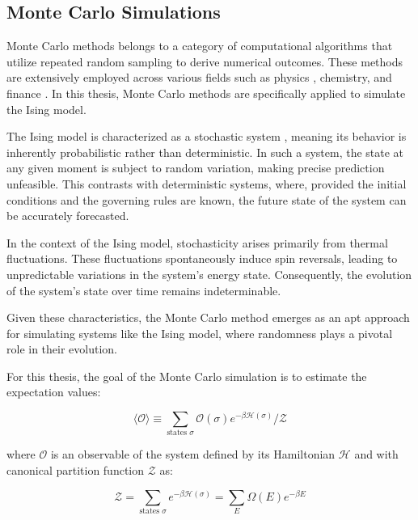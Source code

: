 \subsection{Monte Carlo Simulations}
\label{sec:montecarlo}

Monte Carlo methods \cite{Landau2021} belongs to a category of computational
algorithms that utilize repeated random sampling to derive numerical outcomes.
These methods are extensively employed across various fields such as physics
\cite{Landau2021}, chemistry, \cite{Andersen2019} and finance
\cite{Glasserman2008}. In this thesis, Monte Carlo methods are specifically
applied to simulate the Ising model.

The Ising model is characterized as a stochastic system \cite{Cinlar1975},
meaning its behavior is inherently probabilistic rather than deterministic. In
such a system, the state at any given moment is subject to random variation,
making precise prediction unfeasible. This contrasts with deterministic systems,
where, provided the initial conditions and the governing rules are known, the
future state of the system can be accurately forecasted.

In the context of the Ising model, stochasticity arises primarily from thermal
fluctuations. These fluctuations spontaneously induce spin reversals, leading to
unpredictable variations in the system's energy state. Consequently, the
evolution of the system's state over time remains indeterminable.

Given these characteristics, the Monte Carlo method emerges as an apt approach
for simulating systems like the Ising model, where randomness plays a pivotal
role in their evolution.

For this thesis, the goal of the Monte Carlo simulation is to estimate the
expectation values:

\begin{equation}
\langle \mathcal{O} \rangle \equiv \sum_{\text{states } \sigma} \mathcal{O}(\sigma) e^{-\beta \mathcal{H}(\sigma)} / \mathcal{Z}
\end{equation}

where $\mathcal{O}$ is an observable of the system defined by its Hamiltonian
$\mathcal{H}$ and with canonical partition function $\mathcal{Z}$ as:

\begin{equation}
\mathcal{Z} = \sum_{\text{states } \sigma} e^{-\beta \mathcal{H}(\sigma)} = \sum_{E} \Omega(E) e^{-\beta E}
\end{equation}

